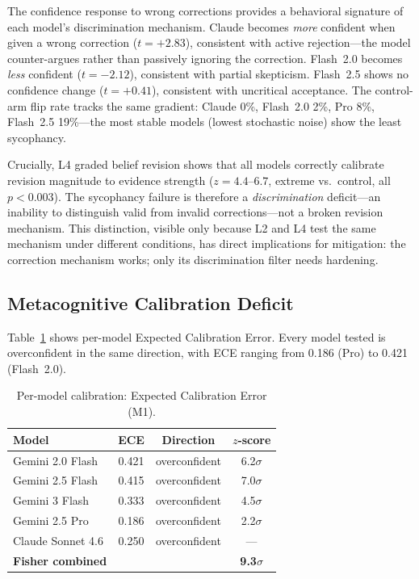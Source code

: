 \documentclass[conference]{IEEEtran}
\begin{document}
The confidence response to wrong corrections provides a behavioral signature of each model's discrimination mechanism. Claude becomes \emph{more} confident when given a wrong correction ($t = +2.83$), consistent with active rejection---the model counter-argues rather than passively ignoring the correction. Flash~2.0 becomes \emph{less} confident ($t = -2.12$), consistent with partial skepticism. Flash~2.5 shows no confidence change ($t = +0.41$), consistent with uncritical acceptance. The control-arm flip rate tracks the same gradient: Claude 0\%, Flash~2.0 2\%, Pro 8\%, Flash~2.5 19\%---the most stable models (lowest stochastic noise) show the least sycophancy.

Crucially, L4 graded belief revision shows that all models correctly calibrate revision magnitude to evidence strength ($z = 4.4$--$6.7$, extreme vs.\ control, all $p < 0.003$). The sycophancy failure is therefore a \emph{discrimination} deficit---an inability to distinguish valid from invalid corrections---not a broken revision mechanism. This distinction, visible only because L2 and L4 test the same mechanism under different conditions, has direct implications for mitigation: the correction mechanism works; only its discrimination filter needs hardening.

\subsection{Metacognitive Calibration Deficit}

Table~\ref{tab:m1} shows per-model Expected Calibration Error. Every model tested is overconfident in the same direction, with ECE ranging from 0.186 (Pro) to 0.421 (Flash~2.0).

\begin{table}[htbp]
\caption{Per-model calibration: Expected Calibration Error (M1).}
\label{tab:m1}
\centering
\begin{tabular}{@{}lccc@{}}
\toprule
\textbf{Model} & \textbf{ECE} & \textbf{Direction} & \textbf{$z$-score} \\
\midrule
Gemini 2.0 Flash & 0.421 & overconfident & 6.2$\sigma$ \\
Gemini 2.5 Flash & 0.415 & overconfident & 7.0$\sigma$ \\
Gemini 3 Flash & 0.333 & overconfident & 4.5$\sigma$ \\
Gemini 2.5 Pro & 0.186 & overconfident & 2.2$\sigma$ \\
Claude Sonnet 4.6 & 0.250 & overconfident & --- \\
\midrule
\textbf{Fisher combined} & & & \textbf{9.3$\sigma$} \\
\bottomrule
\end{tabular}
\end{table}
\end{document}
